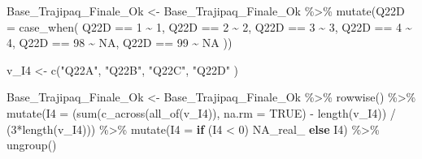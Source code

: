 \documentclass[
]{article}
\newenvironment{Shaded}{\begin{snugshade}}{\end{snugshade}}
\newcommand{\AttributeTok}[1]{\textcolor[rgb]{0.77,0.63,0.00}{#1}}
\newcommand{\ConstantTok}[1]{\textcolor[rgb]{0.00,0.00,0.00}{#1}}
\newcommand{\ControlFlowTok}[1]{\textcolor[rgb]{0.13,0.29,0.53}{\textbf{#1}}}
\newcommand{\DecValTok}[1]{\textcolor[rgb]{0.00,0.00,0.81}{#1}}
\newcommand{\FunctionTok}[1]{\textcolor[rgb]{0.00,0.00,0.00}{#1}}
\newcommand{\NormalTok}[1]{#1}
\newcommand{\OtherTok}[1]{\textcolor[rgb]{0.56,0.35,0.01}{#1}}
\newcommand{\SpecialCharTok}[1]{\textcolor[rgb]{0.00,0.00,0.00}{#1}}
\newcommand{\StringTok}[1]{\textcolor[rgb]{0.31,0.60,0.02}{#1}}
\begin{document}
\begin{Shaded}
\begin{Highlighting}[]
\NormalTok{Base\_Trajipaq\_Finale\_Ok }\OtherTok{\textless{}{-}}
\NormalTok{  Base\_Trajipaq\_Finale\_Ok }\SpecialCharTok{\%\textgreater{}\%}
  \FunctionTok{mutate}\NormalTok{(}\AttributeTok{Q22D =} \FunctionTok{case\_when}\NormalTok{(}
\NormalTok{    Q22D }\SpecialCharTok{==} \DecValTok{1} \SpecialCharTok{\textasciitilde{}} \DecValTok{1}\NormalTok{,}
\NormalTok{    Q22D }\SpecialCharTok{==} \DecValTok{2} \SpecialCharTok{\textasciitilde{}} \DecValTok{2}\NormalTok{,}
\NormalTok{    Q22D }\SpecialCharTok{==} \DecValTok{3} \SpecialCharTok{\textasciitilde{}} \DecValTok{3}\NormalTok{,}
\NormalTok{    Q22D }\SpecialCharTok{==} \DecValTok{4} \SpecialCharTok{\textasciitilde{}} \DecValTok{4}\NormalTok{,}
\NormalTok{    Q22D }\SpecialCharTok{==} \DecValTok{98} \SpecialCharTok{\textasciitilde{}} \ConstantTok{NA}\NormalTok{,}
\NormalTok{    Q22D }\SpecialCharTok{==} \DecValTok{99} \SpecialCharTok{\textasciitilde{}} \ConstantTok{NA}
\NormalTok{  ))}
\end{Highlighting}
\end{Shaded}

\begin{Shaded}
\begin{Highlighting}[]
\NormalTok{v\_I4 }\OtherTok{\textless{}{-}} \FunctionTok{c}\NormalTok{(}\StringTok{"Q22A"}\NormalTok{,}
          \StringTok{"Q22B"}\NormalTok{,}
          \StringTok{"Q22C"}\NormalTok{,}
          \StringTok{"Q22D"}
\NormalTok{          )}

\NormalTok{Base\_Trajipaq\_Finale\_Ok }\OtherTok{\textless{}{-}}
\NormalTok{  Base\_Trajipaq\_Finale\_Ok }\SpecialCharTok{\%\textgreater{}\%}
  \FunctionTok{rowwise}\NormalTok{() }\SpecialCharTok{\%\textgreater{}\%}
  \FunctionTok{mutate}\NormalTok{(}\AttributeTok{I4 =}\NormalTok{ (}\FunctionTok{sum}\NormalTok{(}\FunctionTok{c\_across}\NormalTok{(}\FunctionTok{all\_of}\NormalTok{(v\_I4)), }\AttributeTok{na.rm =} \ConstantTok{TRUE}\NormalTok{) }\SpecialCharTok{{-}} \FunctionTok{length}\NormalTok{(v\_I4)) }\SpecialCharTok{/}\NormalTok{ (}\DecValTok{3}\SpecialCharTok{*}\FunctionTok{length}\NormalTok{(v\_I4))) }\SpecialCharTok{\%\textgreater{}\%}
  \FunctionTok{mutate}\NormalTok{(}\AttributeTok{I4 =} \ControlFlowTok{if}\NormalTok{ (I4 }\SpecialCharTok{\textless{}} \DecValTok{0}\NormalTok{) }\ConstantTok{NA\_real\_} \ControlFlowTok{else}\NormalTok{ I4) }\SpecialCharTok{\%\textgreater{}\%}
  \FunctionTok{ungroup}\NormalTok{()}
\end{Highlighting}
\end{Shaded}

\begin{Shaded}
\end{Shaded}
\end{document}
